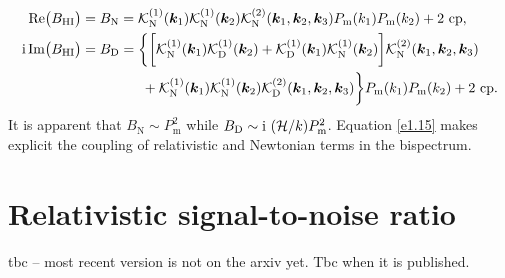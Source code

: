 \begin{itemize}
\begin{align}
\mathrm{Re}\big(B_{{\mathrm{HI}}}\big) &= B_{\mathrm{N}} = \mathcal{K}^{(1)}_{\mathrm{N}}(\bm{k}_{1})\mathcal{K}^{(1)}_{\mathrm{N}}(\bm{k}_{2})\mathcal{K}^{(2)}_{\mathrm{N}}(\bm{k}_{1}, \bm{k}_{2}, \bm{k}_{3})P_{\mathrm{m}} (k_{1})P_{\mathrm{m}} (k_{2}) + \text{2 cp}, \label{e1.14}\\
{\mathrm{i \,Im}}\big(B_{{\mathrm{HI}}}\big) &= B_{\mathrm{D}}= \bigg\{\bigg[\mathcal{K}^{(1)}_{\mathrm{N}}(\bm{k}_{1})\mathcal{K}^{(1)}_{\mathrm{D}}(\bm{k}_{2}) + \mathcal{K}^{(1)}_{\mathrm{D}}(\bm{k}_{1})\mathcal{K}^{(1)}_{\mathrm{N}}(\bm{k}_{2})\bigg]\mathcal{K}^{(2)}_{\mathrm{N}}(\bm{k}_{1},\bm{k}_{2},\bm{k}_{3}) 
\label{e1.15}\\ \nonumber 
& ~~~~~~~~~~~~~ +\mathcal{K}^{(1)}_{\mathrm{N}}(\bm{k}_{1})\mathcal{K}^{(1)}_{\mathrm{N}}(\bm{k}_{2})\mathcal{K}^{(2)}_{\mathrm{D}}(\bm{k}_{1},\bm{k}_{2},\bm{k}_{3})\bigg\}P_{\mathrm{m}} (k_{1})P_{\mathrm{m}} (k_{2})+\text{2 cp}.
\end{align}
It is apparent that {$B_{\mathrm{N}} \sim P_{\mathrm{m}} ^2$ while $B_{\mathrm{D}} \sim {\mathrm{i\,}}\, (\mathcal{H}/k) P_{\mathrm{m}} ^2$.}
Equation \eqref{e1.15} makes explicit the coupling of relativistic  and Newtonian terms in the bispectrum.
\end{itemize}
%
%
%
%
\section{Relativistic signal-to-noise ratio}
%

tbc -- most recent version is not on the arxiv yet. Tbc when it is published. 